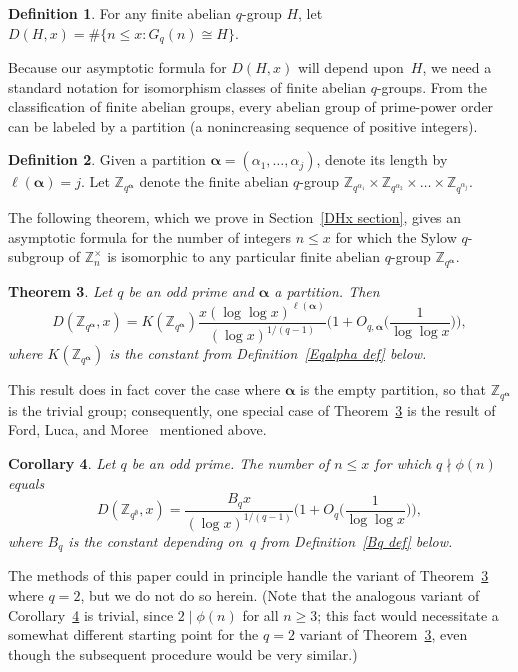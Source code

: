 \documentclass[12pt,reqno]{amsart}
\newtheorem{theorem}{Theorem}[section]
\newtheorem{corollary}[theorem]{Corollary}
\theoremstyle{definition}
\newtheorem{definition}[theorem]{Definition}
\newcommand{\Z}{{\mathbb Z}}
\newcommand{\balpha}{{\bm\alpha}}
\begin{document}
\begin{definition} \label{DHx def}
For any finite abelian $q$-group $H$, let $D(H,x)={\#\{n\le x \colon G_q(n)\cong H\}}$.
\end{definition}

Because our asymptotic formula for $D(H,x)$ will depend upon~$H$, we need a standard notation for isomorphism classes of finite abelian $q$-groups.
From the classification of finite abelian groups, every abelian group of prime-power order can be labeled by a partition (a nonincreasing sequence of positive integers).

\begin{definition}
Given a partition $\balpha=(\alpha_1,\dots,\alpha_j)$, denote its length by $\ell(\balpha)=j$. Let $\Z_{q^\balpha}$ denote the finite abelian $q$-group $\Z_{q^{\alpha_1}}\times\Z_{q^{\alpha_2}}\times\dots\times\Z_{q^{\alpha_j}}$.
\end{definition}

The following theorem, which we prove in Section~\ref{DHx section}, gives an asymptotic formula for the number of integers $n\le x$ for which the Sylow $q$-subgroup of $\Z_n^\times$ is isomorphic to any particular finite abelian $q$-group $\Z_{q^\balpha}$.

\begin{theorem} \label{main}
Let $q$ be an odd prime and $\balpha$ a partition. Then
\[
D(\Z_{q^\balpha},x)=K(\Z_{q^\balpha}) \frac{x(\log\log x)^{\ell(\balpha)}}{(\log x)^{1/(q-1)}} \bigg( 1+O_{q,\balpha}\bigg(\frac1{\log\log x} \bigg) \bigg),
\]
where $K(\Z_{q^\balpha})$ is the constant from Definition~\ref{Eqalpha def} below.
\end{theorem}

This result does in fact cover the case where $\balpha$ is the empty partition, so that $\Z_{q^\balpha}$ is the trivial group; consequently, one special case of Theorem~\ref{main} is the result of Ford, Luca, and Moree~\cite{FordLucaMoree} mentioned above.

\begin{corollary} \label{main cor}
Let $q$ be an odd prime. The number of $n\le x$ for which $q\nmid \phi(n)$ equals
\[
D(\Z_{q^{\emptyset}},x) = \frac{B_q x}{(\log x)^{1/(q-1)}} \bigg( 1+O_q \bigg(\frac1{\log\log x} \bigg) \bigg),
\]
where $B_q$ is the constant depending on~$q$ from Definition~\ref{Bq def} below.
\end{corollary}

The methods of this paper could in principle handle the variant of Theorem~\ref{main} where $q=2$, but we do not do so herein. (Note that the analogous variant of Corollary~\ref{main cor} is trivial, since $2\mid\phi(n)$ for all $n\ge3$; this fact would necessitate a somewhat different starting point for the $q=2$ variant of Theorem~\ref{main}, even though the subsequent procedure would be very similar.)
\end{document}
